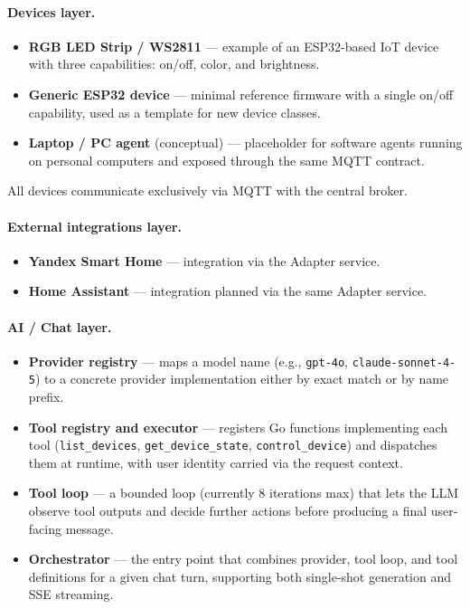 \documentclass[a4paper,12pt]{article}
\begin{document}
\paragraph{Devices layer.}
\begin{itemize}
  \item \textbf{RGB LED Strip / WS2811} --- example of an ESP32-based IoT device with three capabilities: on/off, color, and brightness.
  \item \textbf{Generic ESP32 device} --- minimal reference firmware with a single on/off capability, used as a template for new device classes.
  \item \textbf{Laptop / PC agent} (conceptual) --- placeholder for software agents running on personal computers and exposed through the same MQTT contract.
\end{itemize}

All devices communicate exclusively via MQTT with the central broker.

\paragraph{External integrations layer.}
\begin{itemize}
  \item \textbf{Yandex Smart Home} --- integration via the Adapter service.
  \item \textbf{Home Assistant} --- integration planned via the same Adapter service.
\end{itemize}

\paragraph{AI / Chat layer.}
\begin{itemize}
  \item \textbf{Provider registry} --- maps a model name (e.g., \verb|gpt-4o|, \verb|claude-sonnet-4-5|) to a concrete provider implementation either by exact match or by name prefix.
  \item \textbf{Tool registry and executor} --- registers Go functions implementing each tool (\verb|list_devices|, \verb|get_device_state|, \verb|control_device|) and dispatches them at runtime, with user identity carried via the request context.
  \item \textbf{Tool loop} --- a bounded loop (currently 8 iterations max) that lets the LLM observe tool outputs and decide further actions before producing a final user-facing message.
  \item \textbf{Orchestrator} --- the entry point that combines provider, tool loop, and tool definitions for a given chat turn, supporting both single-shot generation and SSE streaming.
\end{itemize}
\end{document}

